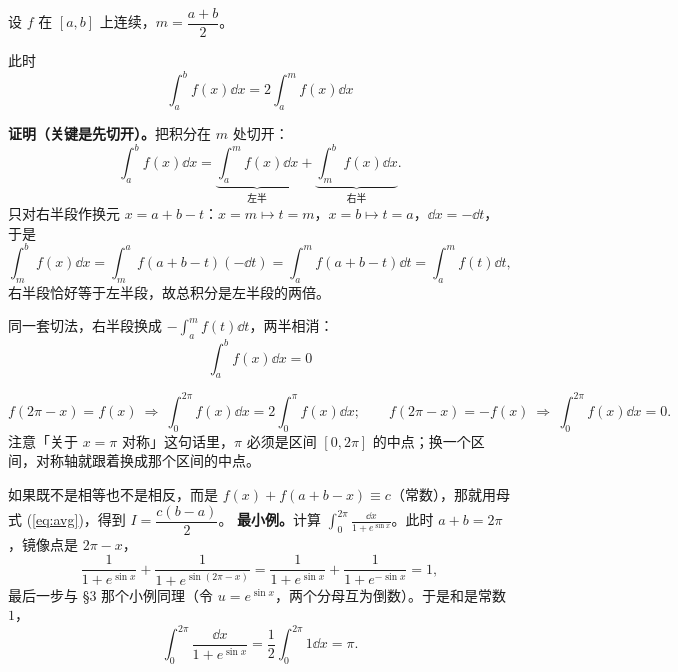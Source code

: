 \documentclass[11pt]{ctexart}
\begin{document}


设 $f$ 在 $[a,b]$ 上连续，$m=\dfrac{a+b}{2}$。


此时
\begin{equation}
\boxed{\;\int_a^b f(x)\dd x=2\int_a^{m} f(x)\dd x\;}
\label{eq:half}
\end{equation}

\textbf{证明（关键是先切开）。}把积分在 $m$ 处切开：
\[
\int_a^b f(x)\dd x=\underbrace{\int_a^{m} f(x)\dd x}_{\text{左半}}
+\underbrace{\int_{m}^{b} f(x)\dd x}_{\text{右半}} .
\]
只对右半段作换元 $x=a+b-t$：$x=m\mapsto t=m$，$x=b\mapsto t=a$，$\dd x=-\dd t$，于是
\[
\int_{m}^{b} f(x)\dd x=\int_{m}^{a} f(a+b-t)(-\dd t)=\int_a^{m} f(a+b-t)\dd t=\int_a^{m} f(t)\dd t ,
\]
右半段恰好等于左半段，故总积分是左半段的两倍。



同一套切法，右半段换成 $-\int_a^m f(t)\dd t$，两半相消：
\begin{equation}
\boxed{\;\int_a^b f(x)\dd x=0\;}
\label{eq:antisym}
\end{equation}


\[
f(2\pi-x)=f(x)\ \Longrightarrow\ \int_0^{2\pi}f(x)\dd x=2\int_0^{\pi}f(x)\dd x ;
\qquad
f(2\pi-x)=-f(x)\ \Longrightarrow\ \int_0^{2\pi}f(x)\dd x=0 .
\]
注意「关于 $x=\pi$ 对称」这句话里，$\pi$ 必须是区间 $[0,2\pi]$ 的中点；换一个区间，对称轴就跟着换成那个区间的中点。


如果既不是相等也不是相反，而是 $f(x)+f(a+b-x)\equiv c$（常数），那就用母式 (\ref{eq:avg})，得到 $I=\dfrac{c(b-a)}{2}$。
\textbf{最小例。}计算 $\displaystyle\int_0^{2\pi}\frac{\dd x}{1+e^{\sin x}}$。此时 $a+b=2\pi$，镜像点是 $2\pi-x$，
\[
\frac{1}{1+e^{\sin x}}+\frac{1}{1+e^{\sin(2\pi-x)}}=\frac{1}{1+e^{\sin x}}+\frac{1}{1+e^{-\sin x}}=1 ,
\]
最后一步与 §3 那个小例同理（令 $u=e^{\sin x}$，两个分母互为倒数）。于是和是常数 $1$，
\[
\int_0^{2\pi}\frac{\dd x}{1+e^{\sin x}}=\frac{1}{2}\int_0^{2\pi}1\dd x=\pi .
\]
\end{document}

